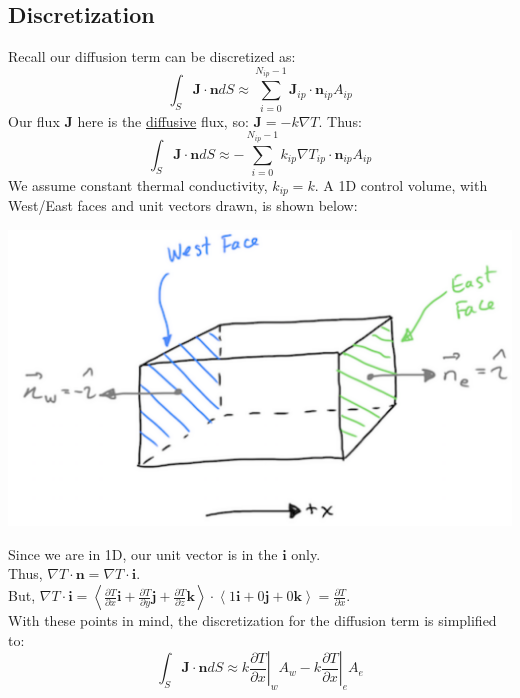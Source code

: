 \documentclass[11pt]{article}
\begin{document}
\subsection{Discretization}
\label{sec:org74a4359}
Recall our diffusion term can be discretized as:
\begin{equation}
\int_S \textbf{J} \cdot \textbf{n} dS \approx \sum_{i=0}^{N_{ip}-1} \textbf{J}_{ip}\cdot \textbf{n}_{ip}A_{ip}
\end{equation}
Our flux \(\textbf{J}\) here is the \uline{diffusive} flux, so: \(\textbf{J} = -k \nabla T\). Thus:
\begin{equation}
\int_S \textbf{J} \cdot \textbf{n} dS \approx -\sum_{i=0}^{N_{ip}-1} k_{ip} \nabla T_{ip}  \cdot \textbf{n}_{ip}A_{ip}
\end{equation}
We assume constant thermal conductivity, \(k_{ip} = k\). A 1D control volume, with West/East faces and unit vectors drawn, is shown below:
\begin{center}
\includegraphics[scale=0.2]{pic/heat1D_CV.png}
\end{center}
Since we are in 1D, our unit vector is in the \(\textbf{i}\) only.\\
Thus, \(\nabla T \cdot \textbf{n} = \nabla T \cdot \textbf{i}\).\\
But, \(\nabla T \cdot \textbf{i} = \left < \frac{\partial T}{\partial x} \textbf{i} + \frac{\partial T}{\partial y} \textbf{j} + \frac{\partial T}{\partial z} \textbf{k}
  \right > \cdot \left <1 \textbf{i} + 0 \textbf{j} + 0 \textbf{k}    \right> = \frac{\partial T}{\partial x}\). \\
With these points in mind, the discretization for the diffusion term is simplified to:
\begin{equation}
\int_S \textbf{J} \cdot \textbf{n} dS \approx k \left .\frac{\partial T}{\partial x}\right|_w A_w
- k \left .\frac{\partial T}{\partial x}\right|_e A_e 
\end{equation}
\end{document}
